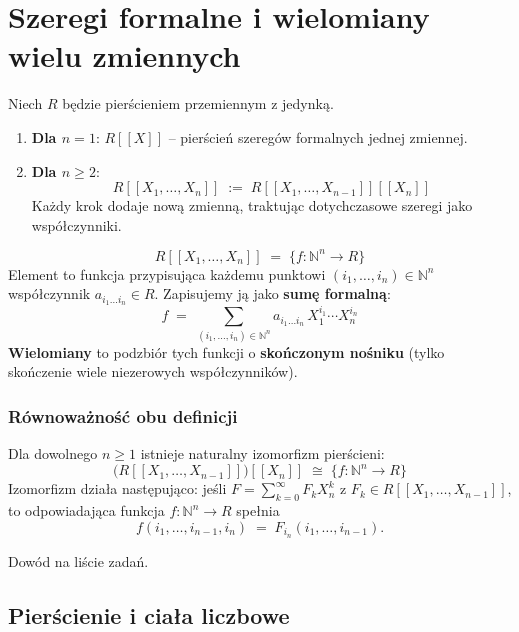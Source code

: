 \section{Szeregi formalne i wielomiany wielu zmiennych}

Niech $R$ będzie pierścieniem przemiennym z jedynką.

\begin{definition}
\begin{enumerate}[label=\arabic*)]
    \item \textbf{Dla $n=1$}: $R[[X]]$ – pierścień szeregów formalnych jednej zmiennej.
    \item \textbf{Dla $n \geq 2$}:
    \[
    R[[X_1,\dots,X_n]] \;:=\; R[[X_1,\dots,X_{n-1}]][[X_n]]
    \]
    Każdy krok dodaje nową zmienną, traktując dotychczasowe szeregi jako współczynniki.
\end{enumerate}
\end{definition}

\begin{definition}
\[
R[[X_1,\dots,X_n]] \;=\; \bigl\{ f \colon \mathbb{N}^n \to R \bigr\}
\]
Element to funkcja przypisująca każdemu punktowi $(i_1,\dots,i_n) \in \mathbb{N}^n$ współczynnik $a_{i_1\dots i_n} \in R$.  
Zapisujemy ją jako \textbf{sumę formalną}:
\[
f \;=\; \sum_{(i_1,\dots,i_n)\in\mathbb{N}^n} a_{i_1\dots i_n} \, X_1^{i_1}\cdots X_n^{i_n}
\]
\textbf{Wielomiany} to podzbiór tych funkcji o \textbf{skończonym nośniku} (tylko skończenie wiele niezerowych współczynników).
\end{definition}
\subsubsection*{Równoważność obu definicji}

\begin{theorem}
Dla dowolnego $n \geq 1$ istnieje naturalny izomorfizm pierścieni:
\[
\bigl( R[[X_1,\dots,X_{n-1}]] \bigr)[[X_n]] \;\cong\; \{ f \colon \mathbb{N}^n \to R \}
\]
Izomorfizm działa następująco:  
jeśli $F = \sum_{k=0}^{\infty} F_k X_n^k$ z $F_k \in R[[X_1,\dots,X_{n-1}]]$,  
to odpowiadająca funkcja $f \colon \mathbb{N}^n \to R$ spełnia
\[
f(i_1,\dots,i_{n-1}, i_n) \;=\; F_{i_n}(i_1,\dots,i_{n-1}).
\]

Dowód na liście zadań.
\end{theorem}
\subsection*{Pierścienie i ciała liczbowe}

